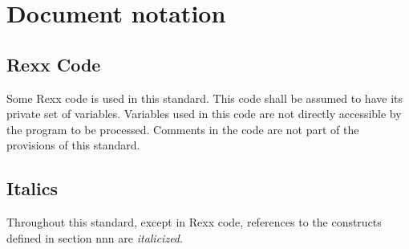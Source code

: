 \section{Document notation}\label{document-notation}

\subsection{Rexx Code}\label{rexx-code}

Some Rexx code is used in this standard. This code shall be assumed to
have its private set of variables. Variables used in this code are not
directly accessible by the program to be processed. Comments in the code
are not part of the provisions of this standard.

\subsection{Italics}\label{italics}

Throughout this standard, except in Rexx code, references to the
constructs defined in section nnn are \emph{italicized}.
